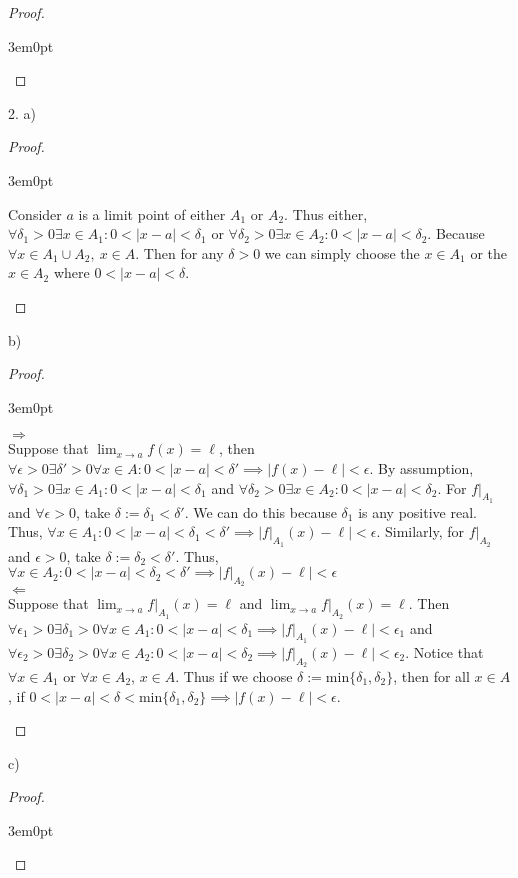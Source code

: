 \documentclass[11pt]{article}
\newenvironment{myproof}
{\begin{proof} \begin{adjustwidth}{3em}{0pt}$ $\par\nobreak\ignorespaces}
{\end{adjustwidth} \end{proof}}
\begin{document}
\begin{flushleft}
\begin{myproof}
\end{myproof}

\newpage

2. a)

\begin{myproof}

Consider $a$ is a limit point of either $A_1$ or $A_2$. Thus either, $\forall \delta_1 > 0 \exists x \in A_1: 0<|x-a|<\delta_1$ or $\forall \delta_2 > 0 \exists x \in A_2: 0<|x-a|<\delta_2$. Because $\forall x \in A_1 \cup A_2, \ x \in A$. Then for any $\delta > 0$ we can simply choose the $x \in A_1$ or the $x \in A_2$ where $0<|x-a|<\delta$.

\end{myproof}

b)

\begin{myproof}
$\Rightarrow$ \\
Suppose that $\lim_{x \to a} f(x) = \ell$, then $\forall \epsilon > 0 \exists \delta' > 0 \forall x \in A: 0 < |x-a| < \delta' \implies |f(x) - \ell| < \epsilon$. By assumption, $\forall \delta_1 > 0 \exists x \in A_1: 0 < |x-a| < \delta_1$ and $\forall \delta_2 > 0 \exists x \in A_2: 0 < |x-a| < \delta_2$. For $f|_{A_1}$ and $\forall \epsilon > 0$, take $\delta := \delta_1 < \delta'$. We can do this because $\delta_1$ is any positive real. Thus, $\forall x \in A_1: 0<|x-a|<\delta_1<\delta' \implies |f|_{A_1}(x) - \ell|< \epsilon$. Similarly, for $f|_{A_2}$ and $\epsilon > 0$, take $\delta := \delta_2 < \delta'$. Thus,  $\forall x \in A_2: 0<|x-a|<\delta_2<\delta' \implies |f|_{A_2}(x) - \ell|< \epsilon$ \\
\bigskip
$\Leftarrow$ \\
Suppose that $\lim_{x \to a}f|_{A_1}(x) = \ell$ and $\lim_{x \to a}f|_{A_2}(x) = \ell$. Then $\forall \epsilon_1 > 0 \exists \delta_1 > 0 \forall x \in A_1: 0< |x-a| < \delta_1 \implies |f|_{A_1}(x) - \ell| < \epsilon_1$ and $\forall \epsilon_2 > 0 \exists \delta_2 > 0 \forall x \in A_2: 0< |x-a| < \delta_2 \implies |f|_{A_2}(x) - \ell| < \epsilon_2$. Notice that $\forall x \in A_1$ or $\forall x \in A_2$, $x \in A$. Thus if we choose $\delta := \text{min} \{ \delta_1 , \delta_2 \}$, then for all $x \in A$, if $0<|x-a|<\delta < \text{min} \{ \delta_1 , \delta_2 \} \implies |f(x) - \ell| < \epsilon$.

\end{myproof}

c)

\begin{myproof}


\end{myproof}
\end{flushleft}
\end{document}
